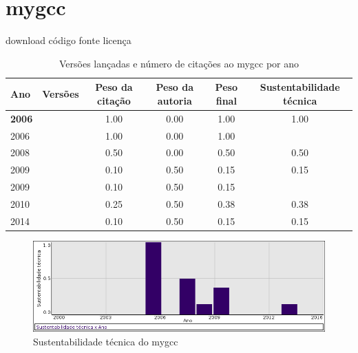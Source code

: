\section{mygcc}
\checkmark download
\checkmark código fonte
\checkmark licença


\begin{table}[H]
\caption{Versões lançadas e número de citações ao mygcc por ano}
\centering
\begin{tabular}{| l | c | c | c | c | c |}
  \hline
  Ano & Versões & Peso da citação & Peso da autoria & Peso final & Sustentabilidade técnica \\
  \hline
            {\bf 2006}
          &
          
          &
          1.00
          &
          0.00
          &
          1.00
          &
            {\color{blue} 1.00}
          \\
            2006
          &
          
          &
          1.00
          &
          0.00
          &
          1.00
          &
          \\
\hline
            2008
          &
          
          &
          0.50
          &
          0.00
          &
          0.50
          &
            {\color{blue} 0.50}
          \\
\hline
            2009
          &
          
          &
          0.10
          &
          0.50
          &
          0.15
          &
            {\color{red} 0.15}
          \\
            2009
          &
          
          &
          0.10
          &
          0.50
          &
          0.15
          &
          \\
\hline
            2010
          &
          
          &
          0.25
          &
          0.50
          &
          0.38
          &
            {\color{red} 0.38}
          \\
\hline
            2014
          &
          
          &
          0.10
          &
          0.50
          &
          0.15
          &
            {\color{red} 0.15}
          \\
\hline
\end{tabular}
\end{table}

\begin{figure}[h]
  \center
  \includegraphics[scale=0.50]{imagens/softwares-charts/mygcc.png}
  \caption{Sustentabilidade técnica do mygcc}
\end{figure}


